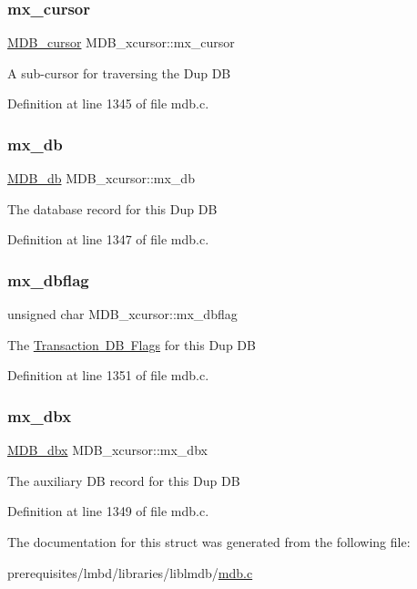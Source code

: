 \subsubsection{\texorpdfstring{mx\+\_\+cursor}{mx\_cursor}}
{\footnotesize\ttfamily \mbox{\hyperlink{struct_m_d_b__cursor}{M\+D\+B\+\_\+cursor}} M\+D\+B\+\_\+xcursor\+::mx\+\_\+cursor}

A sub-\/cursor for traversing the Dup DB 

Definition at line 1345 of file mdb.\+c.

\mbox{\label{struct_m_d_b__xcursor_a40d92cd9b6d087fd6feb32ef270fc6e8}} 
\subsubsection{\texorpdfstring{mx\+\_\+db}{mx\_db}}
{\footnotesize\ttfamily \mbox{\hyperlink{struct_m_d_b__db}{M\+D\+B\+\_\+db}} M\+D\+B\+\_\+xcursor\+::mx\+\_\+db}

The database record for this Dup DB 

Definition at line 1347 of file mdb.\+c.

\mbox{\label{struct_m_d_b__xcursor_a1763a0629d63d352f9f61c1e277304b5}} 
\subsubsection{\texorpdfstring{mx\+\_\+dbflag}{mx\_dbflag}}
{\footnotesize\ttfamily unsigned char M\+D\+B\+\_\+xcursor\+::mx\+\_\+dbflag}

The \mbox{\hyperlink{group__mt__dbflag}{Transaction DB Flags}} for this Dup DB 

Definition at line 1351 of file mdb.\+c.

\mbox{\label{struct_m_d_b__xcursor_a7799c836fd4ba7a94943a6be037bbc99}} 
\subsubsection{\texorpdfstring{mx\+\_\+dbx}{mx\_dbx}}
{\footnotesize\ttfamily \mbox{\hyperlink{struct_m_d_b__dbx}{M\+D\+B\+\_\+dbx}} M\+D\+B\+\_\+xcursor\+::mx\+\_\+dbx}

The auxiliary DB record for this Dup DB 

Definition at line 1349 of file mdb.\+c.



The documentation for this struct was generated from the following file\+:\begin{DoxyCompactItemize}
\item 
prerequisites/lmbd/libraries/liblmdb/\mbox{\hyperlink{mdb_8c}{mdb.\+c}}\end{DoxyCompactItemize}
